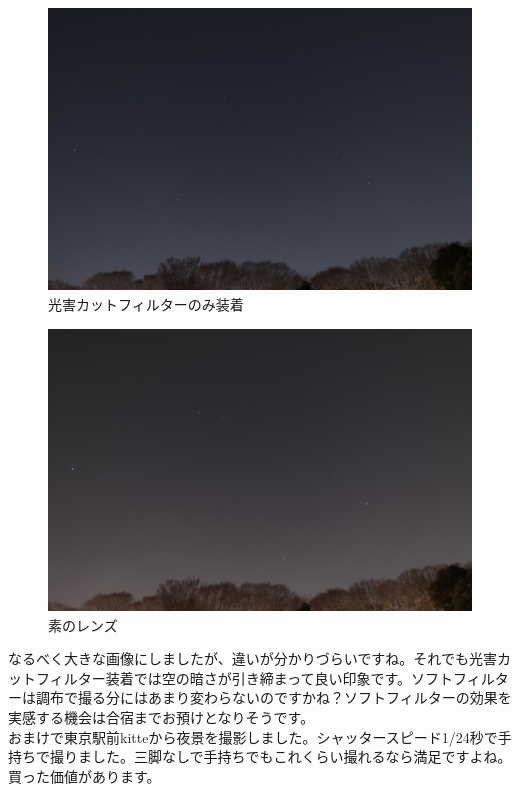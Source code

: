 \documentclass[../../super_nova_2023]{subfiles}
\begin{document}
\begin{figure}[H]
	\begin{center}
		\includegraphics[width=14cm]{figures/Maruyama/cut.jpg}
		\caption{光害カットフィルターのみ装着}
	\end{center}
\end{figure}
\begin{figure}[H]
	\begin{center}
		\includegraphics[width=14cm]{figures/Maruyama/normal.jpg}
		\caption{素のレンズ}
	\end{center}
\end{figure}
なるべく大きな画像にしましたが、違いが分かりづらいですね。それでも光害カットフィルター装着では空の暗さが引き締まって良い印象です。ソフトフィルターは調布で撮る分にはあまり変わらないのですかね？ソフトフィルターの効果を実感する機会は合宿までお預けとなりそうです。\\
おまけで東京駅前kitteから夜景を撮影しました。シャッタースピード1/24秒で手持ちで撮りました。三脚なしで手持ちでもこれくらい撮れるなら満足ですよね。買った価値があります。
\end{document}
